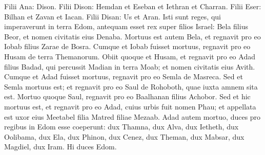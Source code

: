 \begin{biblechapter}
\verse Filii Ana: Dison. Filii Dison: Hemdan et Eseban et Iethran et Charran. 
\verse Filii Eser: Bilhan et Zavan et Iacan. Filii Disan: Us et Aran.
 \verse Isti sunt reges, qui imperaverunt in terra Edom, antequam esset rex super filios Israel: Bela filius Beor, et nomen civitatis eius Denaba. 
\verse Mortuus est autem Bela, et regnavit pro eo Iobab filius Zarae de Bosra. 
\verse Cumque et Iobab fuisset mortuus, regnavit pro eo Husam de terra Themanorum. 
\verse Obiit quoque et Husam, et regnavit pro eo Adad filius Badad, qui percussit Madian in terra Moab; et nomen civitatis eius Avith. 
\verse Cumque et Adad fuisset mortuus, regnavit pro eo Semla de Masreca. 
\verse Sed et Semla mortuus est; et regnavit pro eo Saul de Rohoboth, quae iuxta amnem sita est.
\verse Mortuo quoque Saul, regnavit pro eo Baalhanan filius Achobor. 
\verse Sed et hic mortuus est, et regnavit pro eo Adad, cuius urbis fuit nomen Phau; et appellata est uxor eius Meetabel filia Matred filiae Mezaab.
 \verse Adad autem mortuo, duces pro regibus in Edom esse coeperunt: dux Thamna, dux Alva, dux Ietheth, 
\verse dux Oolibama, dux Ela, dux Phinon, 
\verse dux Cenez, dux Theman, dux Mabsar, 
\verse dux Magdiel, dux Iram. Hi duces Edom.
 

\end{biblechapter}
